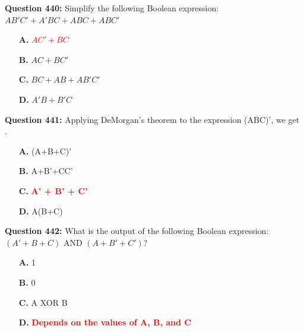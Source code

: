 \documentclass[12pt,a4paper]{article}
\begin{document}
\textbf{Question 440:} \underline{\hspace{1.5cm}}Simplify the following Boolean expression: $AB'C' + A'BC + ABC + ABC'$

\begin{itemize}
    \item[\textbf{A.}] \textcolor{red}{\textbf{$AC' + BC$}}
    \item[\textbf{B.}] $AC + BC'$
    \item[\textbf{C.}] $BC + AB + AB'C'$
    \item[\textbf{D.}] $A'B + B'C$
\end{itemize}

\vspace{0.5cm}

\vspace{0.5cm}

\textbf{Question 441:} Applying DeMorgan's theorem to the expression (ABC)', we get \underline{\hspace{1.5cm}}.

\begin{itemize}
    \item[\textbf{A.}] (A+B+C)'
    \item[\textbf{B.}] A+B'+CC'
    \item[\textbf{C.}] \textcolor{red}{\textbf{A' + B' + C'}}
    \item[\textbf{D.}] A(B+C)
\end{itemize}

\vspace{0.5cm}

\vspace{0.5cm}

\textbf{Question 442:} \underline{\hspace{1.5cm}}What is the output of the following Boolean expression: $(A' + B + C)\text{ AND }(A + B' + C')$?

\begin{itemize}
    \item[\textbf{A.}] 1
    \item[\textbf{B.}] 0
    \item[\textbf{C.}] A XOR B
    \item[\textbf{D.}] \textcolor{red}{\textbf{Depends on the values of A, B, and C}}
\end{itemize}

\vspace{0.5cm}

\vspace{0.5cm}
\end{document}
